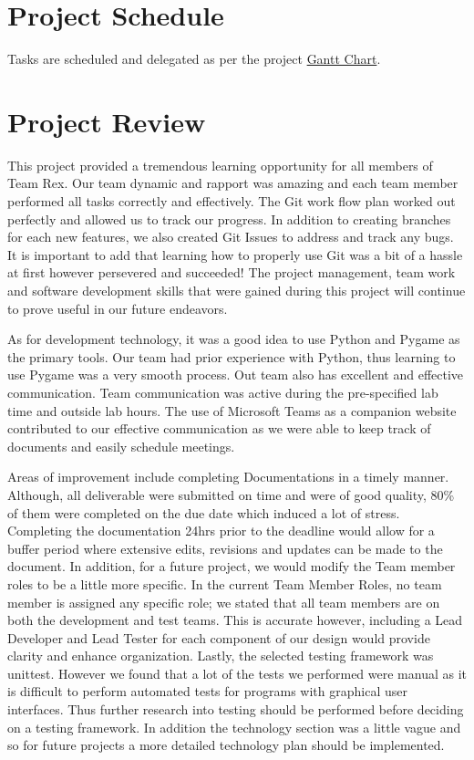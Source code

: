 \documentclass{article}
\begin{document}
	\section{Project Schedule}

Tasks are scheduled and delegated as per the project
\label{subsec:Tasks}
\href{https://gitlab.cas.mcmaster.ca/maramotc/se3xa3/-/blob/main/GanttChart.pdf}{\color{blue}Gantt Chart}.
		
	
	
	\section{Project Review}
	\color{blue}
	This project provided a tremendous learning opportunity for all members of Team Rex.
	Our team dynamic and rapport was amazing and each team member performed all tasks correctly and effectively.
	The Git work flow plan worked out perfectly and allowed us to track our progress. In addition to creating branches for each new features, we also created Git Issues to address and track any bugs. It is important to add that learning how to properly use Git was a bit of a hassle at first however persevered and succeeded!
	The project management, team work and software development skills that were gained during this project will continue to prove useful in our future endeavors.
	
	As for development technology, it was a good idea to use Python and Pygame as the primary tools.
	Our team had prior experience with Python, thus learning to use Pygame was a very smooth process. 
	Out team also has excellent and effective communication. Team communication was active during the pre-specified lab time and outside lab hours. The use of Microsoft Teams as a companion website contributed to our effective communication as we were able to keep track of documents and easily schedule meetings.
	
	
	Areas of improvement include completing Documentations in a timely manner.
	Although, all deliverable were submitted on time and were of good quality, 80\% of them were completed on the due date which induced a lot of stress. Completing the documentation 24hrs prior to the deadline would allow for a buffer period where extensive edits, revisions and updates can be made to the document.
	In addition, for a future project, we would modify the Team member roles to be a little more specific. 
	In the current Team Member Roles, no team member is assigned any specific role; we stated that all team members are on both the development and test teams. This is accurate however, including a Lead Developer and Lead Tester for each component of our design would provide clarity and enhance organization. Lastly, the selected testing framework was unittest. However we found that a lot of the tests we performed were manual as it is difficult to perform automated tests for programs with graphical user interfaces. Thus further research into testing should be performed before deciding on a testing framework.
	In addition the technology section was a little vague and so for future projects a more detailed technology plan should be implemented.
\end{document}
